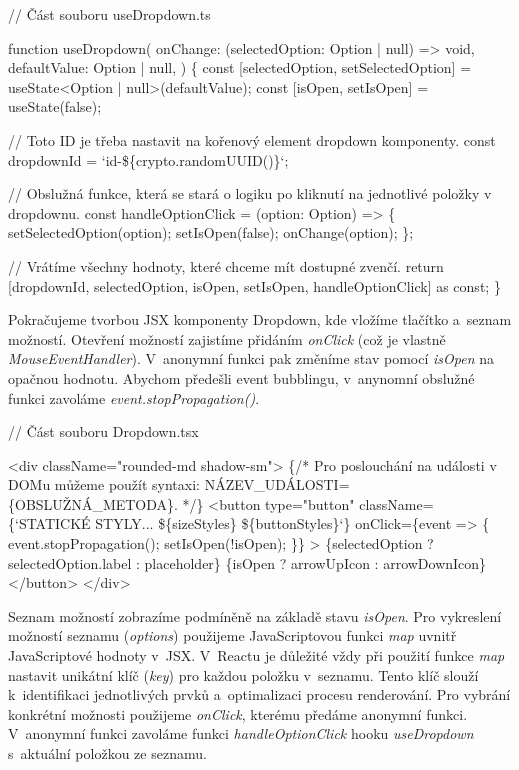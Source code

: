 \begin{prog}
// Část souboru useDropdown.ts

function useDropdown(
  onChange: (selectedOption: Option | null) => void,
  defaultValue: Option | null,
) \{
  const [selectedOption, setSelectedOption] 
    = useState<Option | null>(defaultValue);
  const [isOpen, setIsOpen] = useState(false);

  // Toto ID je třeba nastavit na kořenový element dropdown komponenty.
  const dropdownId = `id-\$\{crypto.randomUUID()\}`;

  // Obslužná funkce, která se stará o logiku
    po kliknutí na jednotlivé položky v dropdownu.
  const handleOptionClick = (option: Option) => \{
    setSelectedOption(option);
    setIsOpen(false);
    onChange(option);
  \};

  // Vrátíme všechny hodnoty, které chceme mít dostupné zvenčí.
  return [dropdownId, selectedOption, 
    isOpen, setIsOpen, handleOptionClick] as const;
\}
\end{prog}

Pokračujeme tvorbou JSX komponenty Dropdown, kde vložíme tlačítko a~seznam možností. Otevření možností zajistíme přidáním \emph{onClick} (což je vlastně \emph{MouseEventHandler}). 
V~anonymní funkci pak změníme stav pomocí \emph{isOpen} na opačnou hodnotu. Abychom předešli event bubblingu, v~anynomní obslužné funkci zavoláme \emph{event.stopPropagation()}.

\begin{prog}
// Část souboru Dropdown.tsx

<div className="rounded-md shadow-sm">
  \{/* Pro poslouchání na události v DOMu můžeme použít syntaxi: 
    NÁZEV_UDÁLOSTI=\{OBSLUŽNÁ_METODA\}. */\}
  <button
    type="button"
    className=\{`STATICKÉ STYLY... \$\{sizeStyles\} \$\{buttonStyles\}`\}
    onClick=\{event => \{
      event.stopPropagation();
      setIsOpen(!isOpen);
    \}\}
  >
    \{selectedOption ? selectedOption.label : placeholder\}
    \{isOpen ? arrowUpIcon : arrowDownIcon\}
  </button>
</div>
\end{prog}

Seznam možností zobrazíme podmíněně na základě stavu \emph{isOpen}. Pro vykreslení možností seznamu (\emph{options}) použijeme JavaScriptovou funkci \emph{map} uvnitř JavaScriptové hodnoty v~JSX. 
V~Reactu je důležité vždy při použití funkce \emph{map} nastavit unikátní klíč (\emph{key}) pro každou položku v~seznamu. Tento klíč slouží k~identifikaci jednotlivých prvků a~optimalizaci procesu renderování. 
Pro vybrání konkrétní možnosti použijeme \emph{onClick}, kterému předáme anonymní funkci. V~anonymní funkci zavoláme funkci \emph{handleOptionClick} hooku \emph{useDropdown} s~aktuální položkou ze seznamu.

